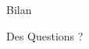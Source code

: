 \documentclass[handout]{beamer}
\begin{document}
\begin{frame}[plain,c]

\begin{center}
\Huge Bilan
\end{center}


\end{frame}

\begin{frame}[plain,c]

\begin{center}
\huge Des Questions ?
\end{center}


\end{frame}
\end{document}
